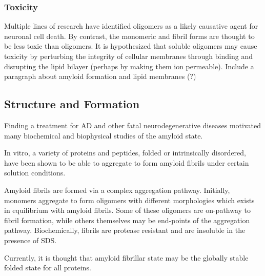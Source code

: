 \subsubsection{Toxicity}
 \begin{outline}
 	\1 Multiple lines of research have identified oligomers as a likely causative agent for neuronal cell death. By contrast, the monomeric and fibril forms are thought to be less toxic than oligomers. It is hypothesized that soluble oligomers may cause toxicity by perturbing the integrity of cellular membranes through binding and disrupting the lipid bilayer (perhaps by making them ion permeable). \cite{Walsh:2007fu}
 	\1 Include a paragraph about amyloid formation and lipid membranes (?)
 \end{outline}

\subsection{Structure and Formation}
	Finding a treatment for AD and other fatal neurodegenerative diseases motivated many biochemical and biophysical studies of the amyloid state.  

  \begin{outline}[enumerate]
	\1 In vitro, a variety of proteins and peptides, folded or intrinsically disordered, have been shown to be able to aggregate to form amyloid fibrils under certain solution conditions. 

	\1 Amyloid fibrils are formed via a complex aggregation pathway. Initially, monomers aggregate to form oligomers with different morphologies which exists in equilibrium with amyloid fibrils. Some of these oligomers are on-pathway to fibril formation, while others themselves may be end-points of the aggregation pathway. Biochemically, fibrils are protease resistant and are insoluble in the presence of SDS.

   \1 Currently, it is thought that amyloid fibrillar state may be the globally stable folded state for all proteins.
  \end{outline}

